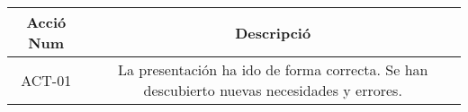 
\begin{center}
\begin{tabular}{|c|c|}
\hline
{\cellcolor[gray]{.8} \bf Acció Num} & {\cellcolor[gray]{.8} \bf Descripció}  \\
\hline
ACT-01 & La presentación ha ido de forma correcta. Se han descubierto nuevas necesidades y errores. \\
\hline
\end{tabular}
\end{center}
